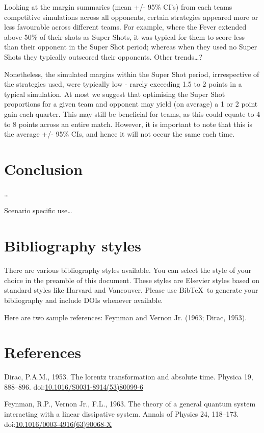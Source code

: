 \documentclass[]{elsarticle} %
\newlength{\cslhangindent}
\newenvironment{cslreferences}%
  {\setlength{\parindent}{0pt}%
  \everypar{\setlength{\hangindent}{\cslhangindent}}\ignorespaces}%
  {\par}
\begin{document}
Looking at the margin summaries (mean +/- 95\% CI's) from each teams
competitive simulations across all opponents, certain strategies
appeared more or less favourable across different teams. For example,
where the Fever extended above 50\% of their shots as Super Shots, it
was typical for them to score less than their opponent in the Super Shot
period; whereas when they used no Super Shots they typically outscored
their opponents. Other trends\ldots?

Nonetheless, the simulated margins within the Super Shot period,
irrrespective of the strategies used, were typically low - rarely
exceeding 1.5 to 2 points in a typical simulation. At most we suggest
that optimising the Super Shot proportions for a given team and opponent
may yield (on average) a 1 or 2 point gain each quarter. This may still
be beneficial for teams, as this could equate to 4 to 8 points across an
entire match. However, it is important to note that this is the average
+/- 95\% CIs, and hence it will not occur the same each time.

\hypertarget{conclusion}{%
\section{Conclusion}\label{conclusion}}

\ldots{}

Scenario specific use\ldots{}

\hypertarget{bibliography-styles}{%
\section{Bibliography styles}\label{bibliography-styles}}

There are various bibliography styles available. You can select the
style of your choice in the preamble of this document. These styles are
Elsevier styles based on standard styles like Harvard and Vancouver.
Please use BibTeX~to generate your bibliography and include DOIs
whenever available.

Here are two sample references: Feynman and Vernon Jr. (1963; Dirac,
1953).

\hypertarget{references}{%
\section*{References}\label{references}}

\hypertarget{refs}{}
\begin{cslreferences}
\leavevmode\hypertarget{ref-Dirac1953888}{}%
Dirac, P.A.M., 1953. The lorentz transformation and absolute time.
Physica 19, 888--896.
doi:\href{https://doi.org/10.1016/S0031-8914(53)80099-6}{10.1016/S0031-8914(53)80099-6}

\leavevmode\hypertarget{ref-Feynman1963118}{}%
Feynman, R.P., Vernon Jr., F.L., 1963. The theory of a general quantum
system interacting with a linear dissipative system. Annals of Physics
24, 118--173.
doi:\href{https://doi.org/10.1016/0003-4916(63)90068-X}{10.1016/0003-4916(63)90068-X}
\end{cslreferences}
\end{document}
